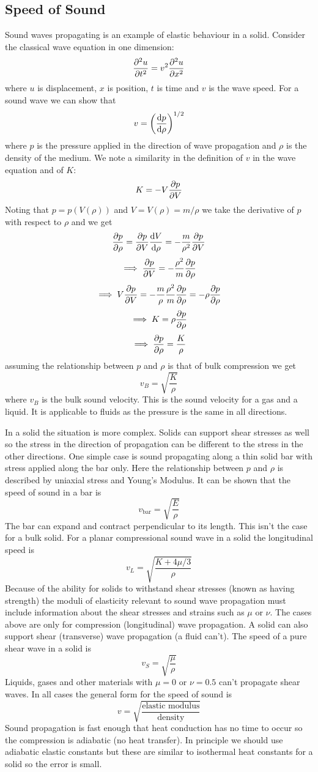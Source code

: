    \subsection{Speed of Sound}
    Sound waves propagating is an example of elastic behaviour in a solid.
    Consider the classical wave equation in one dimension:
    \[\pdv[2]{u}{t} = v^2\pdv[2]{u}{x}\]
    where \(u\) is displacement, \(x\) is position, \(t\) is time and \(v\) is the wave speed.
    For a sound wave we can show that
    \[v = \left(\dv{p}{\rho}\right)^{1/2}\]
    where \(p\) is the pressure applied in the direction of wave propagation and \(\rho\) is the density of the medium.
    We note a similarity in the definition of \(v\) in the wave equation and of \(K\):
    \[K = -V\pdv{p}{V}\]
    Noting that \(p = p(V(\rho))\) and \(V =V(\rho) = m/\rho\) we take the derivative of \(p\) with respect to \(\rho\) and we get
    \[\pdv{p}{\rho} = \pdv{p}{V}\dv{V}{\rho} = -\frac{m}{\rho^2}\pdv{p}{V}\]
    \[\implies \pdv{p}{V} = -\frac{\rho^2}{m}\pdv{p}{\rho}\]
    \[\implies V\pdv{p}{V} = -\frac{m}{\rho}\frac{\rho^2}{m}\pdv{p}{\rho} = -\rho\pdv{p}{\rho}\]
    \[\implies K = \rho\pdv{p}{\rho}\]
    \[\implies \pdv{p}{\rho} = \frac{K}{\rho}\]
    assuming the relationship between \(p\) and \(\rho\) is that of bulk compression we get
    \[v_B = \sqrt{\frac{K}{\rho}}\]
    where \(v_B\) is the bulk sound velocity.
    This is the sound velocity for a gas and a liquid.
    It is applicable to fluids as the pressure is the same in all directions.
    
    In a solid the situation is more complex.
    Solids can support shear stresses as well so the stress in the direction of propagation can be different to the stress in the other directions.
    One simple case is sound propagating along a thin solid bar with stress applied along the bar only.
    Here the relationship between \(p\) and \(\rho\) is described by uniaxial stress and Young's Modulus.
    It can be shown that the speed of sound in a bar is
    \[v_\text{bar} = \sqrt{\frac{E}{\rho}}\]
    The bar can expand and contract perpendicular to its length.
    This isn't the case for a bulk solid.
    For a planar compressional sound wave in a solid the longitudinal speed is
    \[v_L = \sqrt{\frac{K + 4\mu/3}{\rho}}\]
    Because of the ability for solids to withstand shear stresses (known as having strength) the moduli of elasticity relevant to sound wave propagation must include information about the shear stresses and strains such as \(\mu\) or \(\nu\).
    The cases above are only for compression (longitudinal) wave propagation.
    A solid can also support shear (transverse) wave propagation (a fluid can't).
    The speed of a pure shear wave in a solid is
    \[v_S = \sqrt{\frac{\mu}{\rho}}\]
    Liquids, gases and other materials with \(\mu = 0\) or \(\nu = 0.5\) can't propagate shear waves.
    In all cases the general form for the speed of sound is
    \[v = \sqrt{\frac{\text{elastic modulus}}{\text{density}}}\]
    Sound propagation is fast enough that heat conduction has no time to occur so the compression is adiabatic (no heat transfer).
    In principle we should use adiabatic elastic constants but these are similar to isothermal heat constants for a solid so the error is small.
    
